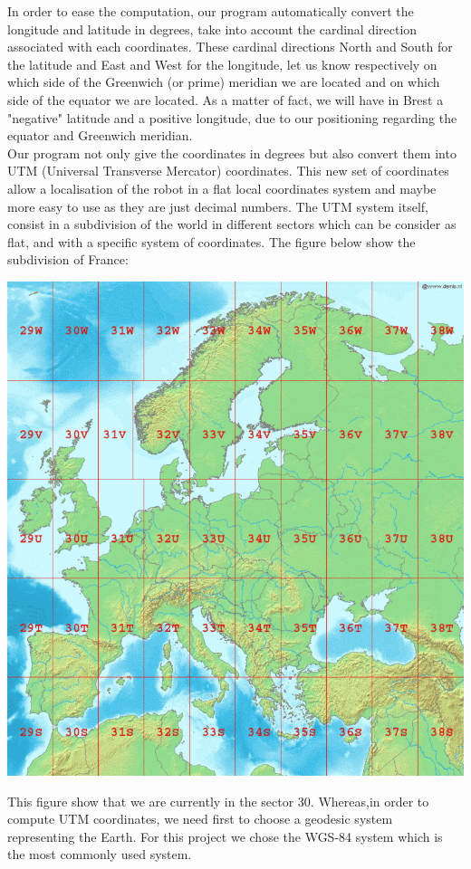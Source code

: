 In order to ease the computation, our program automatically convert the longitude and latitude in degrees, take into account the cardinal direction associated with each coordinates.
These cardinal directions North and South for the latitude and East and West for the longitude, let us know respectively on which side of the Greenwich (or prime) meridian we are located and on which side of the equator we are located. As a matter of fact, we will have in Brest a "negative" latitude and a positive longitude, due to our positioning regarding the equator and Greenwich meridian.\\

Our program not only give the coordinates in degrees but also convert them into UTM (Universal Transverse Mercator) coordinates. This new set of coordinates allow a localisation of the robot in a flat local coordinates system and maybe more easy to use as they are just decimal numbers. The UTM system itself, consist in a subdivision of the world in different sectors which can be consider as flat, and with a specific system of coordinates.
The figure below show the subdivision of France: \

\begin{center}
\includegraphics[scale=0.2]{secteurUTM.png} 
\label{fig1}
\end{center}

This figure show that we are currently in the sector 30. Whereas,in order to compute UTM coordinates, we need first to choose a geodesic system representing the Earth. For this project we chose the WGS-84 system which is the most commonly used system.